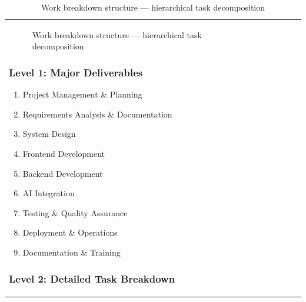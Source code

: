 \documentclass[12pt, a4paper]{article}
\begin{document}
\begin{itemize}[leftmargin=1.5em, itemsep=3pt]
\begin{table}[H]
\begin{tabularx}{\textwidth}{>{\raggedright\arraybackslash}p{0.8cm}>{\raggedright\arraybackslash}p{3.5cm}>{\raggedright\arraybackslash}X>{\raggedright\arraybackslash}p{2.5cm}}
\begin{figure}[H]
\begin{tikzpicture}
\end{tikzpicture}
\caption{Work breakdown structure --- hierarchical task decomposition}
\label{fig:wbs-diagram}
\end{figure}

\subsubsection*{Level 1: Major Deliverables}

\begin{enumerate}[leftmargin=1.5em, itemsep=3pt]
    \item Project Management \& Planning
    \item Requirements Analysis \& Documentation
    \item System Design
    \item Frontend Development
    \item Backend Development
    \item AI Integration
    \item Testing \& Quality Assurance
    \item Deployment \& Operations
    \item Documentation \& Training
\end{enumerate}

\subsubsection*{Level 2: Detailed Task Breakdown}


\end{tabularx}
\end{table}
\end{itemize}
\end{document}
